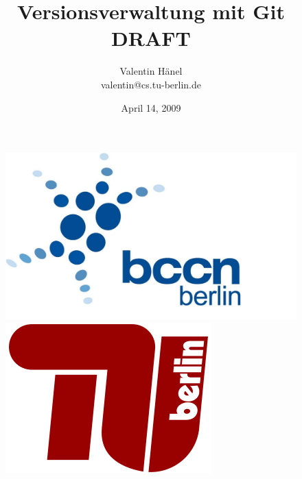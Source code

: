 \documentclass[ hyperref={colorlinks=true,filecolor=blue,linkcolor=blue,urlcolor=blue}]{beamer}
\author{Valentin H\"anel\\
        valentin@cs.tu-berlin.de}
\institute{Technische Universität Berlin \\
Bernstein Center for Computational Neuroscience Berlin}
\title{Versionsverwaltung mit Git \\DRAFT}
\date{April 14, 2009}
\begin{document}

\begin{frame}
	\titlepage
    \begin{figure}
	\includegraphics[scale=0.05]{BCCN_logo_berlin.pdf}
	\includegraphics[scale=0.14]{tu_logo.png}
\end{figure}

\end{frame}


\end{document}
